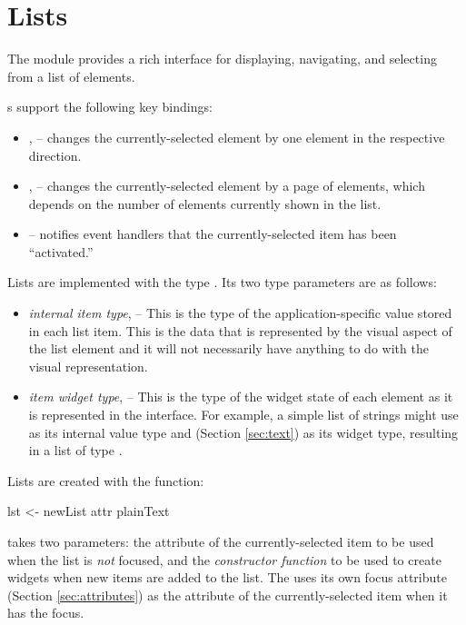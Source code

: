 \section{Lists}
\label{sec:lists}

The  module provides a rich interface for displaying,
navigating, and selecting from a list of elements.

s support the following key bindings:

\begin{itemize}
\item {},  -- changes the currently-selected element by
  one element in the respective direction.
\item {},  -- changes the currently-selected
  element by a page of elements, which depends on the number of
  elements currently shown in the list.
\item {} -- notifies event handlers that the
  currently-selected item has been ``activated.''
\end{itemize}

Lists are implemented with the type .  Its two type
parameters are as follows:

\begin{itemize}
\item \textit{internal item type},  -- This is the type of the
  application-specific value stored in each list item.  This is the
  data that is represented by the visual aspect of the list element
  and it will not necessarily have anything to do with the visual
  representation.
\item \textit{item widget type},  -- This is the type of the
  widget state of each element as it is represented in the interface.
  For example, a simple list of strings might use  as its
  internal value type and  (Section
  \ref{sec:text}) as its widget type, resulting in a list of type
  .
\end{itemize}

Lists are created with the  function:

\begin{haskellcode}
 lst <- newList attr plainText
\end{haskellcode}

 takes two parameters: the attribute of the
currently-selected item to be used when the list is \textit{not}
focused, and the \textit{constructor function} to be used to create
widgets when new items are added to the list.  The  uses its
own focus attribute (Section \ref{sec:attributes}) as the attribute of
the currently-selected item when it has the focus.

